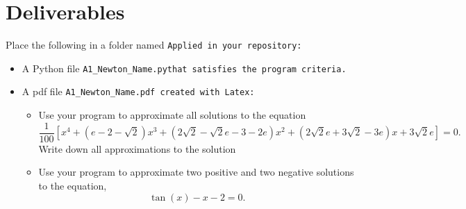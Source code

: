 \documentclass{article}
\newcommand\foldername{\tt{Applied} }
\newcommand\filename{\tt{A1\_Newton\_Name.py}\;\;}
\begin{document}
\section*{Deliverables}
	
	
	Place the following in a folder named \foldername in your repository:
	\begin{itemize}
		\item A Python file \filename  that satisfies the program criteria.
		\item A pdf file \tt{A1\_Newton\_Name.pdf} created with Latex:
		\begin{itemize}
			\item Use your program to approximate all solutions to the equation
			\[ \frac{1}{100}[x^4 + (e -2 - \sqrt{2})x^3 + (2\sqrt{2} - \sqrt{2}e-3-2e)x^2 + (2\sqrt{2}e + 3\sqrt{2} -3e)x + 3\sqrt{2}e] = 0.\]
			Write down all  approximations to the solution
			\item Use your program to approximate two positive and two negative solutions to the equation,
			 \[ \tan(x) - x -2 = 0.\]
		\end{itemize}
	\end{itemize}

	
\end{document}
